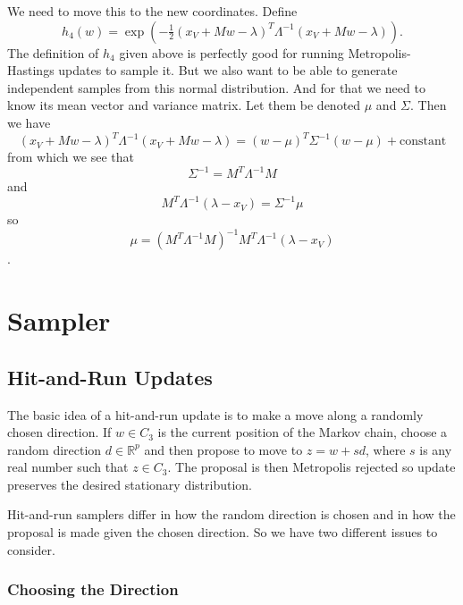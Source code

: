\documentclass[11pt]{article}
\newcommand{\real}{\mathbb{R}}
\begin{document}
We need to move this to the new coordinates.  Define
\begin{equation} \label{eq:h-approx-new}
   h_4(w)
   =
   \exp\left(- \tfrac{1}{2} (x_V + M w - \lambda)^T
   \Lambda^{- 1} (x_V + M w - \lambda) \right).
\end{equation}
The definition of $h_4$ given above is perfectly good for running
Metropolis-Hastings updates to sample it.  But we also want to
be able to generate independent samples from this normal distribution.
And for that we need to know its mean vector and variance matrix.
Let them be denoted $\mu$ and $\Sigma$.  Then we have
$$
   (x_V + M w - \lambda)^T \Lambda^{- 1} (x_V + M w - \lambda)
   =
   (w - \mu)^T \Sigma^{- 1} (w - \mu) + \text{constant}
$$
from which we see that
\begin{equation} \label{eq:h-approx-new-variance}
   \Sigma^{- 1} = M^T \Lambda^{- 1} M
\end{equation}
and
$$
   M^T \Lambda^{- 1} (\lambda - x_V) = \Sigma^{- 1} \mu
$$
so
\begin{equation} \label{eq:h-approx-new-mean}
   \mu = \left( M^T \Lambda^{- 1} M \right)^{- 1}
   M^T \Lambda^{- 1} (\lambda - x_V)
\end{equation}
\citep[compare equation (25) in][]{geyer-meeden}.

\section{Sampler}

\subsection{Hit-and-Run Updates}

The basic idea of a hit-and-run update is to make a move along a randomly
chosen direction.    If $w \in C_3$ is the current position of the Markov
chain, choose a random direction $d \in \real^p$ and then propose to move
to $z = w + s d$, where $s$ is any real number such that $z \in C_3$.
The proposal is then Metropolis rejected so update preserves the desired
stationary distribution.

Hit-and-run samplers differ in how the random direction is chosen and in
how the proposal is made given the chosen direction.  So we have two
different issues to consider.

\subsubsection{Choosing the Direction}
\end{document}
